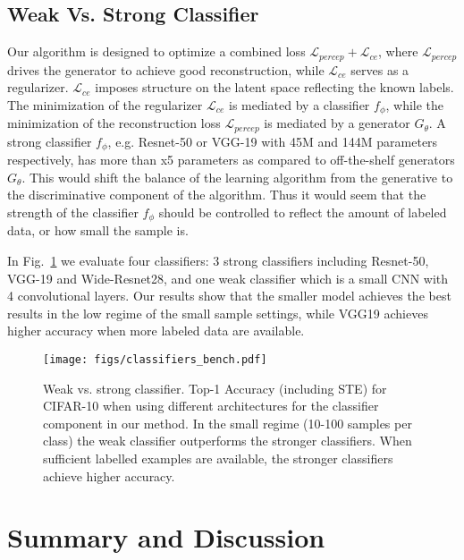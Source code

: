 \documentclass[a4paper,conference]{IEEEtran}
\begin{document}
\subsection{Weak Vs. Strong Classifier}
\label{sec:weak-vs-strong}

Our algorithm is designed to optimize a combined loss $\mathcal{L}_{\textit{percep}}+\mathcal{L}_{\textit{ce}}$, where $\mathcal{L}_{\textit{percep}}$ drives the generator to achieve good reconstruction, while $\mathcal{L}_{\textit{ce}}$ serves as a regularizer. $\mathcal{L}_{\textit{ce}}$ imposes structure on the latent space reflecting the known labels. The minimization of the regularizer $\mathcal{L}_{\textit{ce}}$ is mediated by a classifier $f_\phi$, while the minimization of the reconstruction loss $\mathcal{L}_{\textit{percep}}$ is mediated by a generator $G_\theta$. A strong classifier $f_\phi$, e.g. Resnet-50 or VGG-19 with 45M and 144M parameters respectively, has more than x5 parameters as compared to off-the-shelf generators $G_\theta$. This would shift the balance of the learning algorithm from the generative to the discriminative component of the algorithm. Thus it would seem that the strength of the classifier  $f_\phi$ should be controlled to reflect the amount of labeled data, or how small the sample is. 

In Fig.~\ref{fig: classifiers} we evaluate four classifiers: 3 strong classifiers including Resnet-50, VGG-19 and Wide-Resnet28, and one weak classifier which is a small CNN with 4 convolutional layers. Our results show that the smaller model achieves the best results  in the low regime of the small sample settings, while VGG19 achieves higher accuracy when more labeled data are available.

\begin{figure}[htbp]
	\vskip -0.2in
	\centerline
{\texttt{[image: figs/classifiers\_bench.pdf]}}

	\caption{Weak vs. strong classifier. Top-1 Accuracy (including STE) for  CIFAR-10 when using different architectures for the classifier component in our method. In the small regime (10-100 samples per class) the weak classifier outperforms the stronger classifiers. When sufficient labelled examples are available, the stronger classifiers achieve higher accuracy.   }
	\label{fig: classifiers}
	\vskip -0.1in
\end{figure}

		

		
\section{Summary and Discussion}
\end{document}
